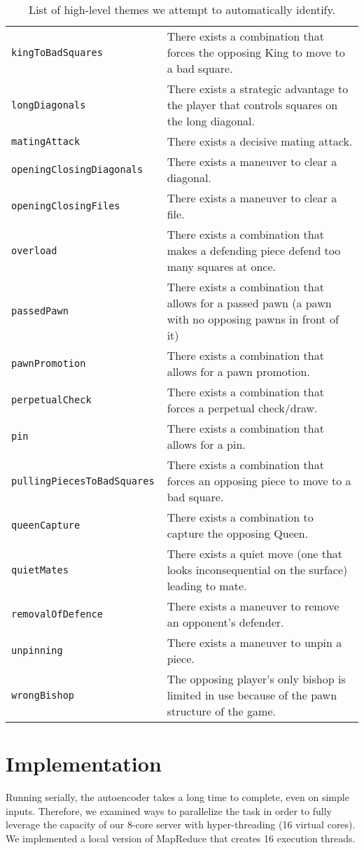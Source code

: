 \documentclass[11pt]{article}
\begin{document}
\begin{table*}
\begin{tabular}{lp{}}
\tt{kingToBadSquares} & There exists a combination that forces the opposing King to move to a bad square. \\
\tt{longDiagonals} & There exists a strategic advantage to the player that controls squares on the long diagonal. \\
\tt{matingAttack} & There exists a decisive mating attack. \\
\tt{openingClosingDiagonals} & There exists a maneuver to clear a diagonal. \\
\tt{openingClosingFiles} & There exists a maneuver to clear a file. \\
\tt{overload} & There exists a combination that makes a defending piece defend too many squares at once. \\
\tt{passedPawn} & There exists a combination that allows for a passed pawn (a pawn with no opposing pawns in front of it) \\
\tt{pawnPromotion} & There exists a combination that allows for a pawn promotion. \\
\tt{perpetualCheck} & There exists a combination that forces a perpetual check/draw. \\
\tt{pin} & There exists a combination that allows for a pin. \\
\tt{pullingPiecesToBadSquares} & There exists a combination that forces an opposing piece to move to a bad square. \\
\tt{queenCapture} & There exists a combination to capture the opposing Queen. \\
\tt{quietMates} & There exists a quiet move (one that looks inconsequential on the surface) leading to mate. \\
\tt{removalOfDefence} & There exists a maneuver to remove an opponent’s defender. \\
\tt{unpinning} & There exists a maneuver to unpin a piece. \\
\tt{wrongBishop} & The opposing player’s only bishop is limited in use because of the pawn structure of the game. \\ \hline
\end{tabular} 
\caption{List of high-level themes we attempt to automatically identify.}
\end{table*}



\section{Implementation} %
Running serially, the autoencoder takes a long time to complete, even on simple inputs. Therefore, we examined ways to parallelize the task in order to fully leverage the capacity of our 8-core server with hyper-threading (16 virtual cores). We implemented a local version of MapReduce that creates 16 execution threads.
\end{document}
